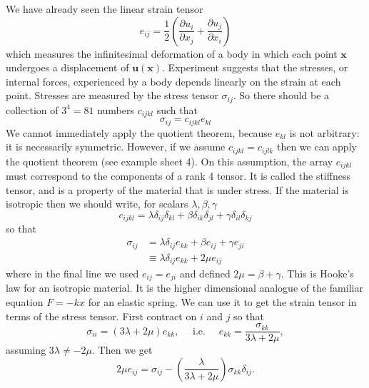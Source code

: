 \begin{example}
    We have already seen the linear strain tensor
    \[
    e_{i j}=\frac{1}{2}\left(\frac{\partial u_{i}}{\partial x_{j}}+\frac{\partial u_{j}}{\partial x_{i}}\right)
    \]
    which measures the infinitesimal deformation of a body in which each point $\mathbf{x}$ undergoes a displacement of $\mathbf{u}(\mathbf{x})$. Experiment suggests that the stresses, or internal forces, experienced by a body depends linearly on the strain at each point. Stresses are measured by the stress tensor $\sigma_{i j} .$ So there should be a collection of $3^{4}=81$ numbers $c_{i j k l}$ such that
    \[
    \sigma_{i j}=c_{i j k l} e_{k l}
    \]
    We cannot immediately apply the quotient theorem, because $e_{k l}$ is not arbitrary: it is necessarily symmetric. However, if we assume $c_{i j k l}=c_{i j l k}$ then we can apply the quotient theorem (see example sheet 4). On this assumption, the array $c_{i j k l}$ must correspond to the components of a rank 4 tensor. It is called the stiffness tensor, and is a property of the material that is under stress. If the material is isotropic then we should write, for scalars $\lambda, \beta, \gamma$
    \[
    c_{i j k l}=\lambda \delta_{i j} \delta_{k l}+\beta \delta_{i k} \delta_{j l}+\gamma \delta_{i l} \delta_{k j}
    \]
    so that
    \[
    \begin{aligned}
    \sigma_{i j} &=\lambda \delta_{i j} e_{k k}+\beta e_{i j}+\gamma e_{j i} \\
    & \equiv \lambda \delta_{i j} e_{k k}+2 \mu e_{i j}
    \end{aligned}
    \]
    where in the final line we used $e_{i j}=e_{j i}$ and defined $2 \mu=\beta+\gamma$. This is Hooke's law for an isotropic material. It is the higher dimensional analogue of the familiar equation $F=-k x$ for an elastic spring. We can use it to get the strain tensor in terms of the stress tensor. First contract on $i$ and $j$ so that
    \[
    \sigma_{i i}=(3 \lambda+2 \mu) e_{k k}, \quad \text { i.e. } \quad e_{k k}=\frac{\sigma_{k k}}{3 \lambda+2 \mu},
    \]
    assuming $3 \lambda \neq-2 \mu .$ Then we get
    \[
    2 \mu e_{i j}=\sigma_{i j}-\left(\frac{\lambda}{3 \lambda+2 \mu}\right) \sigma_{k k} \delta_{i j}.
    \]
\end{example}